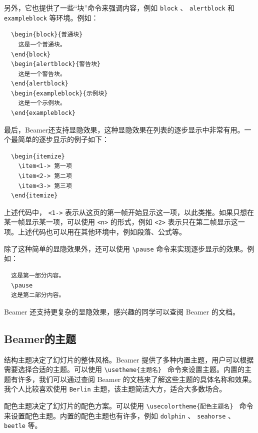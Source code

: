 另外，它也提供了一些“块”命令来强调内容，例如  \texttt{block} 、 \texttt{alertblock}  和  \texttt{exampleblock}  等环境。例如：
\begin{verbatim}
  \begin{block}{普通块}
    这是一个普通块。
  \end{block}
  \begin{alertblock}{警告块}
    这是一个警告块。
  \end{alertblock}
  \begin{exampleblock}{示例块}
    这是一个示例块。
  \end{exampleblock}
\end{verbatim}

最后，Beamer还支持显隐效果，这种显隐效果在列表的逐步显示中非常有用。一个最简单的逐步显示的例子如下：
\begin{verbatim}
  \begin{itemize}
    \item<1-> 第一项
    \item<2-> 第二项
    \item<3-> 第三项
  \end{itemize}
\end{verbatim}
上述代码中， \texttt{<1->}  表示从这页的第一帧开始显示这一项，以此类推。如果只想在某一帧显示某一项，可以使用  \texttt{<n>}  的形式，例如  \texttt{<2>}  表示只在第二帧显示这一项。上述代码也可以用在其他环境中，例如段落、公式等。

除了这种简单的显隐效果外，还可以使用  \texttt{\textbackslash pause}  命令来实现逐步显示的效果。例如：
\begin{verbatim}
  这是第一部分内容。
  \pause
  这是第二部分内容。
\end{verbatim}

Beamer 还支持更复杂的显隐效果，感兴趣的同学可以查阅 Beamer 的文档。

\subsection{Beamer的主题}

结构主题决定了幻灯片的整体风格。Beamer 提供了多种内置主题，用户可以根据需要选择合适的主题。可以使用  \texttt{\textbackslash usetheme\{主题名\} } 命令来设置主题。内置的主题有许多，我们可以通过查阅 Beamer 的文档来了解这些主题的具体名称和效果。我个人比较喜欢使用 \texttt{Berlin} 主题，该主题简洁大方，适合大多数场合。

配色主题决定了幻灯片的配色方案。可以使用  \texttt{\textbackslash usecolortheme\{配色主题名\} } 命令来设置配色主题。内置的配色主题也有许多，例如  \texttt{dolphin} 、 \texttt{seahorse} 、 \texttt{beetle}  等。

